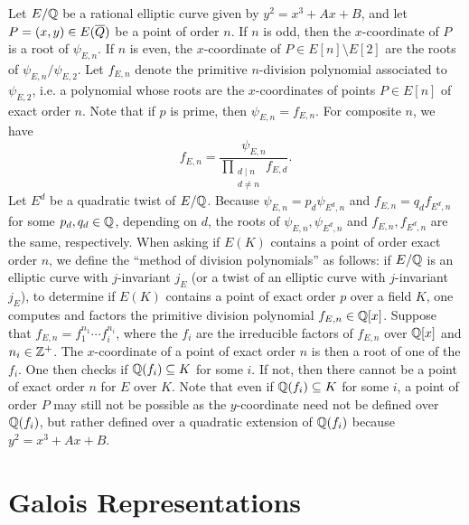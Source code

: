 Let $E/\mathbb{Q}$ be a rational elliptic curve given by $y^2= x^3 + Ax + B$, and let $P= (x,y) \in E(\overline{Q})$ be a point of order $n$. If $n$ is odd, then the $x$-coordinate of $P$ is a root of $\psi_{E,n}$. If $n$ is even, the $x$-coordinate of $P \in E[n] \setminus E[2]$ are the roots of $\psi_{E,n}/\psi_{E,2}$. Let $f_{E,n}$ denote the primitive $n$-division polynomial associated to $\psi_{E,2}$, i.e. a polynomial whose roots are the $x$-coordinates of points $P \in E[n]$ of exact order $n$. Note that if $p$ is prime, then $\psi_{E,n}= f_{E,n}$. For composite $n$, we have
	\[
	f_{E,n}= \dfrac{\psi_{E,n}}{\prod_{\substack{d \mid n \\ d \neq n}} f_{E,d}}.
	\]
Let $E^d$ be a quadratic twist of $E/\mathbb{Q}$. Because $\psi_{E,n}= p_d \psi_{E^d,n}$ and $f_{E,n}= q_d f_{E^d,n}$ for some $p_d, q_d \in \mathbb{Q}$, depending on $d$, the roots of $\psi_{E,n}, \psi_{E^d,n}$ and $f_{E,n}, f_{E^d,n}$ are the same, respectively. When asking if $E(K)$ contains a point of order exact order $n$, we define the ``method of division polynomials'' as follows: if $E/\mathbb{Q}$ is an elliptic curve with $j$-invariant $j_E$ (or a twist of an elliptic curve with $j$-invariant $j_E$), to determine if $E(K)$ contains a point of exact order $p$ over a field $K$, one computes and factors the primitive division polynomial $f_{E,n} \in \mathbb{Q}[x]$. Suppose that $f_{E,n}= f_1^{n_1} \cdots f_i^{n_i}$, where the $f_i$ are the irreducible factors of $f_{E,n}$ over $\mathbb{Q}[x]$ and $n_i \in \mathbb{Z}^+$. The $x$-coordinate of a point of exact order $n$ is then a root of one of the $f_i$. One then checks if $\mathbb{Q}(f_i) \subseteq K$ for some $i$. If not, then there cannot be a point of exact order $n$ for $E$ over $K$. Note that even if $\mathbb{Q}(f_i) \subseteq K$ for some $i$, a point of order $P$ may still not be possible as the $y$-coordinate need not be defined over $\mathbb{Q}(f_i)$, but rather defined over a quadratic extension of $\mathbb{Q}(f_i)$ because $y^2= x^3 + Ax + B$. 





\section{Galois Representations\label{sec:galrep}} 

